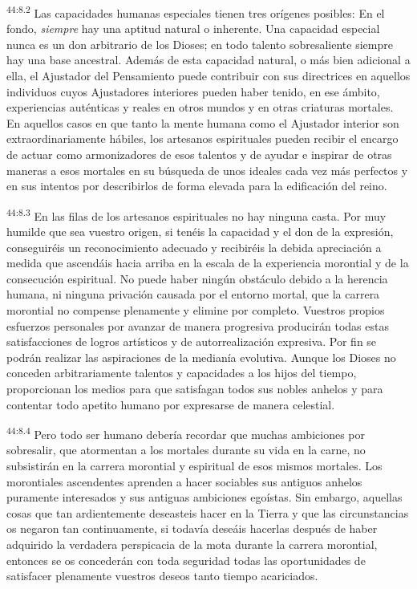 \par
\textsuperscript{44:8.2} Las capacidades humanas especiales tienen tres orígenes posibles: En el fondo, \textit{siempre} hay una aptitud natural o inherente. Una capacidad especial nunca es un don arbitrario de los Dioses; en todo talento sobresaliente siempre hay una base ancestral. Además de esta capacidad natural, o más bien adicional a ella, el Ajustador del Pensamiento puede contribuir con sus directrices en aquellos individuos cuyos Ajustadores interiores pueden haber tenido, en ese ámbito, experiencias auténticas y reales en otros mundos y en otras criaturas mortales. En aquellos casos en que tanto la mente humana como el Ajustador interior son extraordinariamente hábiles, los artesanos espirituales pueden recibir el encargo de actuar como armonizadores de esos talentos y de ayudar e inspirar de otras maneras a esos mortales en su búsqueda de unos ideales cada vez más perfectos y en sus intentos por describirlos de forma elevada para la edificación del reino.

\par
\textsuperscript{44:8.3} En las filas de los artesanos espirituales no hay ninguna casta. Por muy humilde que sea vuestro origen, si tenéis la capacidad y el don de la expresión, conseguiréis un reconocimiento adecuado y recibiréis la debida apreciación a medida que ascendáis hacia arriba en la escala de la experiencia morontial y de la consecución espiritual. No puede haber ningún obstáculo debido a la herencia humana, ni ninguna privación causada por el entorno mortal, que la carrera morontial no compense plenamente y elimine por completo. Vuestros propios esfuerzos personales por avanzar de manera progresiva producirán todas estas satisfacciones de logros artísticos y de autorrealización expresiva. Por fin se podrán realizar las aspiraciones de la medianía evolutiva. Aunque los Dioses no conceden arbitrariamente talentos y capacidades a los hijos del tiempo, proporcionan los medios para que satisfagan todos sus nobles anhelos y para contentar todo apetito humano por expresarse de manera celestial.

\par
\textsuperscript{44:8.4} Pero todo ser humano debería recordar que muchas ambiciones por sobresalir, que atormentan a los mortales durante su vida en la carne, no subsistirán en la carrera morontial y espiritual de esos mismos mortales. Los morontiales ascendentes aprenden a hacer sociables sus antiguos anhelos puramente interesados y sus antiguas ambiciones egoístas. Sin embargo, aquellas cosas que tan ardientemente deseasteis hacer en la Tierra y que las circunstancias os negaron tan continuamente, si todavía deseáis hacerlas después de haber adquirido la verdadera perspicacia de la mota durante la carrera morontial, entonces se os concederán con toda seguridad todas las oportunidades de satisfacer plenamente vuestros deseos tanto tiempo acariciados.

